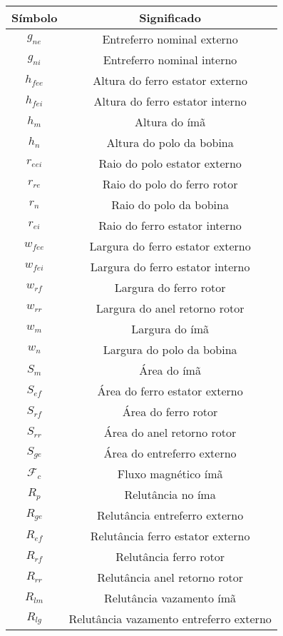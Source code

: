 \begin{tabular}{|c|c|}
Símbolo &  Significado \\ 
\hline \hline

	$g_{ne}$	& Entreferro nominal externo \\
	$g_{ni}$	& Entreferro nominal interno \\

	$h_{fee}$	& Altura do ferro estator externo \\
	$h_{fei}$	& Altura do ferro estator interno \\
	$h_m$		& Altura do ímã \\
	$h_n$		& Altura do polo da bobina \\
	
	$r_{eei}$	& Raio do polo estator externo \\				
	$r_{re}$	& Raio do polo do ferro rotor \\		
	$r_{n}$		& Raio do polo da bobina \\		
	$r_{ei}$	& Raio do ferro estator interno \\	

	$w_{fee}$	& Largura do ferro estator externo\\
	$w_{fei}$	& Largura do ferro estator interno \\
	$w_{rf}$	& Largura do ferro rotor \\
	$w_{rr}$	& Largura do anel retorno rotor \\
	$w_m$		& Largura do ímã \\
	$w_n$		& Largura do polo da bobina \\

	$S_m$		& Área do ímã\\	
	$S_{ef}$	& Área do ferro estator externo \\
	$S_{rf}$	& Área do ferro rotor\\
	$S_{rr}$	& Área do anel retorno rotor\\
	$S_{ge}$	& Área do entreferro externo\\

	$\mathcal{F}_c$ & Fluxo magnético ímã 				\\
	$R_{p}$			& Relutância no íma 				\\
	$R_{ge}$		& Relutância entreferro externo 	\\
	$R_{ef}$		& Relutância ferro estator externo 	\\
	$R_{rf}$		& Relutância ferro rotor 			\\
	$R_{rr}$		& Relutância anel retorno rotor 	\\
	$R_{lm}$		& Relutância vazamento ímã 			\\
	$R_{lg}$		& Relutância vazamento entreferro externo \\


\end{tabular}
